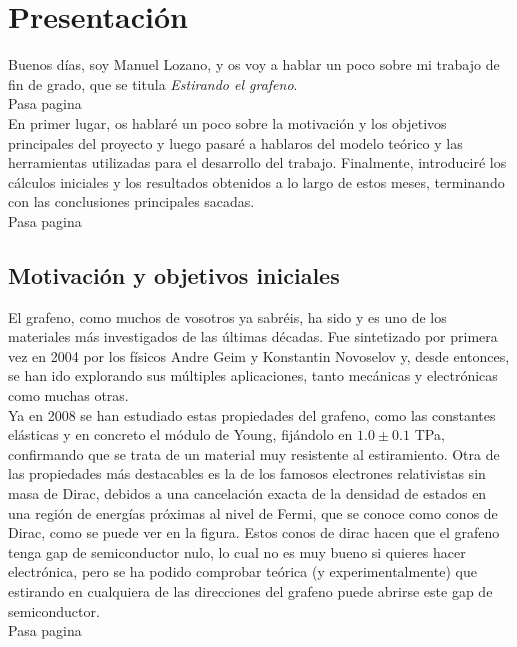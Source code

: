 \chapter{Presentación}
\newcommand{\pasa}{{\color{red} Pasa pagina} \\}
\large
Buenos días, soy Manuel Lozano, y os voy a hablar un poco sobre mi trabajo de fin de grado, que se titula \emph{Estirando el grafeno}. \\

\pasa

En primer lugar, os hablaré un poco sobre la motivación y los objetivos principales del proyecto y luego pasaré a hablaros del modelo teórico y las herramientas utilizadas para el desarrollo del trabajo. Finalmente, introduciré los cálculos iniciales y los resultados obtenidos a lo largo de estos meses, terminando con las conclusiones principales sacadas. \\

\pasa

\section{Motivación y objetivos iniciales}

El grafeno, como muchos de vosotros ya sabréis, ha sido y es uno de los materiales más investigados de las últimas décadas. Fue sintetizado por primera vez en 2004 por los físicos Andre Geim y Konstantin Novoselov y, desde entonces, se han ido explorando sus múltiples aplicaciones, tanto mecánicas y electrónicas como muchas otras. \\

Ya en 2008 se han estudiado estas propiedades del grafeno, como las constantes elásticas y en concreto el módulo de Young, fijándolo en $1.0 \pm 0.1 $ TPa, confirmando que se trata de un material muy resistente al estiramiento. Otra de las propiedades más destacables es la de los famosos electrones relativistas sin masa de Dirac, debidos a una cancelación exacta de la densidad de estados en una región de energías próximas al nivel de Fermi, que se conoce como conos de Dirac, como se puede ver en la figura. Estos conos de dirac hacen que el grafeno tenga gap de semiconductor nulo, lo cual no es muy bueno si quieres hacer electrónica, pero se ha podido comprobar teórica (y experimentalmente) que estirando en cualquiera de las direcciones del grafeno puede abrirse este gap de semiconductor. \\

\pasa


